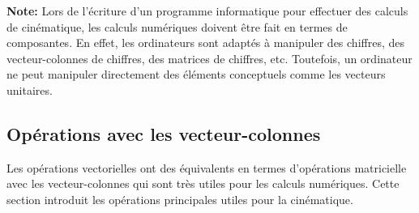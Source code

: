\textbf{Note:} Lors de l'écriture d'un programme informatique pour effectuer des calculs de cinématique, les calculs numériques doivent être fait en termes de composantes. En effet, les ordinateurs sont adaptés à manipuler des chiffres, des vecteur-colonnes de chiffres, des matrices de chiffres, etc. Toutefois, un ordinateur ne peut manipuler directement des éléments conceptuels comme les vecteurs unitaires.  

\subsection{Opérations avec les vecteur-colonnes} 
%
Les opérations vectorielles ont des équivalents en termes d'opérations matricielle avec les vecteur-colonnes qui sont très utiles pour les calculs numériques. Cette section introduit les opérations principales utiles pour la cinématique.

